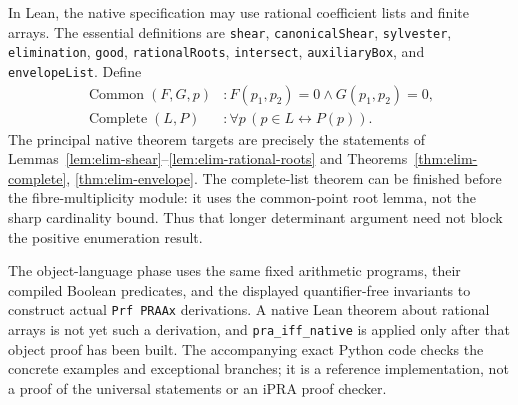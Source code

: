 In Lean, the native specification may use rational coefficient lists and
finite arrays.  The essential definitions are
\texttt{shear}, \texttt{canonicalShear}, \texttt{sylvester},
\texttt{elimination}, \texttt{good}, \texttt{rationalRoots},
\texttt{intersect}, \texttt{auxiliaryBox}, and
\texttt{envelopeList}.  Define
\[
\begin{split}
 \operatorname{Common}(F,G,p)&:
       F(p_1,p_2)=0\wedge G(p_1,p_2)=0,\\
 \operatorname{Complete}(L,P)&:
       \forall p\,(p\in L\leftrightarrow P(p)).
\end{split}
\]
The principal native theorem targets are precisely the statements of
Lemmas~\ref{lem:elim-shear}--\ref{lem:elim-rational-roots} and
Theorems~\ref{thm:elim-complete}, \ref{thm:elim-envelope}.  The
complete-list theorem can be finished before the fibre-multiplicity
module: it uses the common-point root lemma, not the sharp cardinality
bound.  Thus that longer determinant argument need not block the positive
enumeration result.

The object-language phase uses the same fixed arithmetic programs,
their compiled Boolean predicates, and the displayed quantifier-free
invariants to construct actual \texttt{Prf PRAAx} derivations.  A native
Lean theorem about rational arrays is not yet such a derivation, and
\texttt{pra\_iff\_native} is applied only after that object proof has
been built.  The accompanying exact Python code checks the concrete
examples and exceptional branches; it is a reference implementation, not
a proof of the universal statements or an iPRA proof checker.
